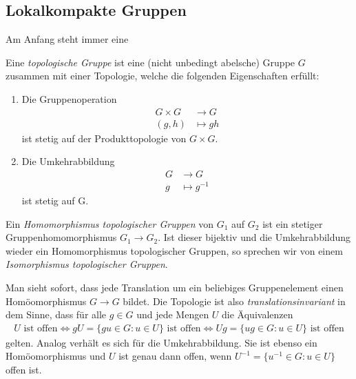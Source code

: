 \subsection{Lokalkompakte Gruppen}
	Am Anfang steht immer eine
	\begin{defi}
		Eine \emph{topologische Gruppe} ist eine (nicht unbedingt abelsche) Gruppe $G$ zusammen mit einer Topologie, welche die folgenden Eigenschaften erfüllt:
			\begin{enumerate}[label=(\roman*)] %
				\item Die Gruppenoperation
					\begin{align*}
						G \times G &\longrightarrow G\\
						(g,h) &\longmapsto gh
					\end{align*}
				ist stetig auf der Produkttopologie von $G \times G$.
				\item Die Umkehrabbildung
					\begin{align*}
						G &\longrightarrow G\\
						g &\longmapsto g^{-1}
					\end{align*}
					ist stetig auf G.
			\end{enumerate}
		Ein \emph{Homomorphismus topologischer Gruppen} von $G_1$ auf $G_2$ ist ein stetiger Gruppenhomomorphismus $G_1 \to G_2$.
		Ist dieser bijektiv und die Umkehrabbildung wieder ein Homomorphismus topologischer Gruppen, so sprechen wir von einem \emph{Isomorphismus topologischer Gruppen}.
	\end{defi}
	Man sieht sofort, dass jede Translation um ein beliebiges Gruppenelement einen Homöomorphismus $G \to G$ bildet.
	Die Topologie ist also \emph{translationsinvariant} in dem Sinne, dass für alle $g \in G$ und jede Mengen $U$ die Äquivalenzen
	\begin{align*}
		U \text{ ist offen} \Leftrightarrow gU = \{gu \in G: u\in U\} \text{ ist offen} \Leftrightarrow Ug = \{ug \in G: u\in U\} \text{ ist offen}
	\end{align*}
	gelten.
	Analog verhält es sich für die Umkehrabbildung. 
	Sie ist ebenso ein Homöomorphismus und $U$ ist genau dann offen, wenn $U^{-1}=\{u^{-1}\in G: u \in U\}$ offen ist.
	
